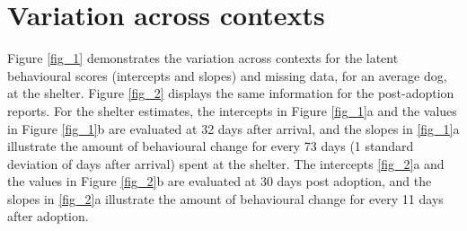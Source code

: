 \documentclass[12pt]{article}
\begin{document}
\section{Variation across contexts}
Figure \ref{fig_1} demonstrates the variation across contexts for the latent behavioural scores (intercepts and slopes) and missing data, for an average dog, at the shelter. Figure \ref{fig_2} displays the same information for the post-adoption reports. For the shelter estimates, the intercepts in Figure \ref{fig_1}a and the values in Figure \ref{fig_1}b are evaluated at 32 days after arrival, and the slopes in \ref{fig_1}a illustrate the amount of behavioural change for every 73 days (1 standard deviation of days after arrival) spent at the shelter. The intercepts \ref{fig_2}a and the values in Figure \ref{fig_2}b are evaluated at 30 days post adoption, and the slopes in \ref{fig_2}a illustrate the amount of behavioural change for every 11 days after adoption.
\end{document}
